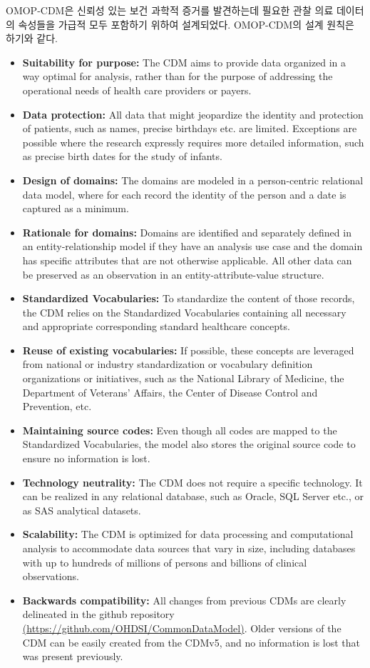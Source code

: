 \documentclass[]{book}
\providecommand{\tightlist}{%
  \setlength{\itemsep}{0pt}\setlength{\parskip}{0pt}}
\begin{document}
OMOP-CDM은 신뢰성 있는 보건 과학적 증거를 발견하는데 필요한 관찰 의료 데이터의 속성들을 가급적 모두 포함하기 위하여 설계되었다. OMOP-CDM의 설계 원칙은 하기와 같다.

\begin{itemize}
\tightlist
\item
  \textbf{Suitability for purpose:} The CDM aims to provide data organized in a way optimal for analysis, rather than for the purpose of addressing the operational needs of health care providers or payers.
\item
  \textbf{Data protection:} All data that might jeopardize the identity and protection of patients, such as names, precise birthdays etc. are limited. Exceptions are possible where the research expressly requires more detailed information, such as precise birth dates for the study of infants.
\item
  \textbf{Design of domains:} The domains are modeled in a person-centric relational data model, where for each record the identity of the person and a date is captured as a minimum.
\item
  \textbf{Rationale for domains:} Domains are identified and separately defined in an entity-relationship model if they have an analysis use case and the domain has specific attributes that are not otherwise applicable. All other data can be preserved as an observation in an entity-attribute-value structure.
\item
  \textbf{Standardized Vocabularies:} To standardize the content of those records, the CDM relies on the Standardized Vocabularies containing all necessary and appropriate corresponding standard healthcare concepts.
\item
  \textbf{Reuse of existing vocabularies:} If possible, these concepts are leveraged from national or industry standardization or vocabulary definition organizations or initiatives, such as the National Library of Medicine, the Department of Veterans' Affairs, the Center of Disease Control and Prevention, etc.
\item
  \textbf{Maintaining source codes:} Even though all codes are mapped to the Standardized Vocabularies, the model also stores the original source code to ensure no information is lost.
\item
  \textbf{Technology neutrality:} The CDM does not require a specific technology. It can be realized in any relational database, such as Oracle, SQL Server etc., or as SAS analytical datasets.
\item
  \textbf{Scalability:} The CDM is optimized for data processing and computational analysis to accommodate data sources that vary in size, including databases with up to hundreds of millions of persons and billions of clinical observations.
\item
  \textbf{Backwards compatibility:} All changes from previous CDMs are clearly delineated in the github repository \href{https://github.com/OHDSI/CommonDataModel}{(https://github.com/OHDSI/CommonDataModel)}. Older versions of the CDM can be easily created from the CDMv5, and no information is lost that was present previously.
\end{itemize}
\end{document}
